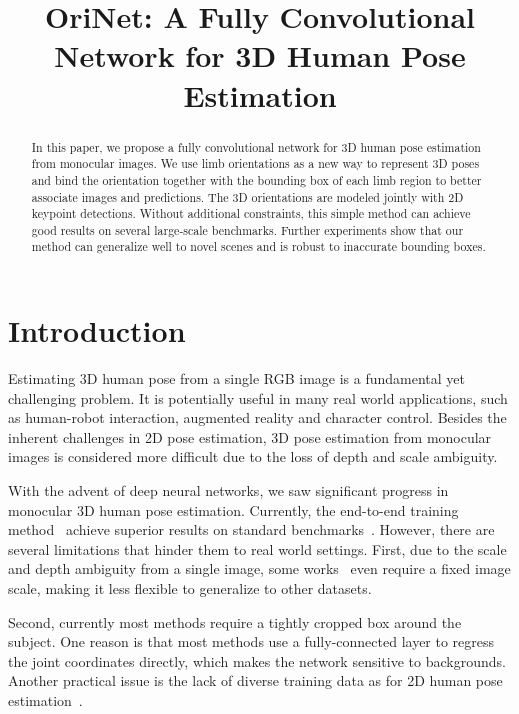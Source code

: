 \documentclass{bmvc2k}
\title{OriNet: A Fully Convolutional Network for 3D Human Pose Estimation}
\begin{document}
\maketitle

\begin{abstract}
In this paper, we propose a fully convolutional network for 3D human pose estimation from monocular images. We use limb orientations as a new way to represent 3D poses and bind the orientation together with the bounding box of each limb region to better associate images and predictions. The 3D orientations are modeled jointly with 2D keypoint detections. Without additional constraints, this simple method can achieve good results on several large-scale benchmarks. Further experiments show that our method can generalize well to novel scenes and is robust to inaccurate bounding boxes.
\end{abstract}

\section{Introduction}


Estimating 3D human pose from a single RGB image is a fundamental yet challenging problem. It is potentially useful in many real world applications, such as human-robot interaction, augmented reality and character control. 
Besides the inherent challenges in 2D pose estimation, 3D pose estimation from monocular images is considered more difficult due to the loss of depth and scale ambiguity.

With the advent of deep neural networks, we saw significant progress in monocular 3D human pose estimation. Currently, the end-to-end training method~\cite{zhou2017weakly,sun2017compositional} achieve superior results on standard benchmarks~\cite{h36m_pami}. However, there are several limitations that hinder them to real world settings. First, due to the scale and depth ambiguity from a single image, some works~\cite{zhou2017weakly,martinez2017simple} even require a fixed image scale, making it less flexible to generalize to other datasets. 
 
Second, currently most methods require a tightly cropped box around the subject. One reason is that most methods use a fully-connected layer to regress the joint coordinates directly, which makes the network sensitive to backgrounds. Another practical issue is the lack of diverse training data as for 2D human pose estimation~\cite{andriluka14cvpr,lin2014microsoft}.
\end{document}
